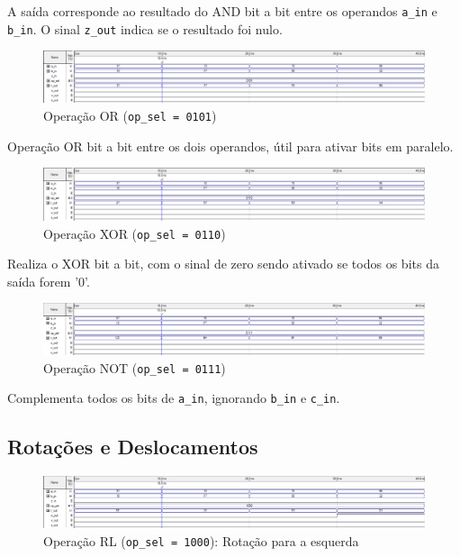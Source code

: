 A saída corresponde ao resultado do AND bit a bit entre os operandos \texttt{a\_in} e \texttt{b\_in}. O sinal \texttt{z\_out} indica se o resultado foi nulo.

\begin{figure}[H]
\centering
\includegraphics[width=\textwidth]{images/alu_0101.png}
\caption{Operação OR (\texttt{op\_sel = 0101})}
\end{figure}

Operação OR bit a bit entre os dois operandos, útil para ativar bits em paralelo.

\begin{figure}[H]
\centering
\includegraphics[width=\textwidth]{images/alu_0110.png}
\caption{Operação XOR (\texttt{op\_sel = 0110})}
\end{figure}

Realiza o XOR bit a bit, com o sinal de zero sendo ativado se todos os bits da saída forem '0'.

\begin{figure}[H]
\centering
\includegraphics[width=\textwidth]{images/alu_0111.png}
\caption{Operação NOT (\texttt{op\_sel = 0111})}
\end{figure}

Complementa todos os bits de \texttt{a\_in}, ignorando \texttt{b\_in} e \texttt{c\_in}.

\subsection{Rotações e Deslocamentos}

\begin{figure}[H]
\centering
\includegraphics[width=\textwidth]{images/alu_1000.png}
\caption{Operação RL (\texttt{op\_sel = 1000}): Rotação para a esquerda}
\end{figure}

